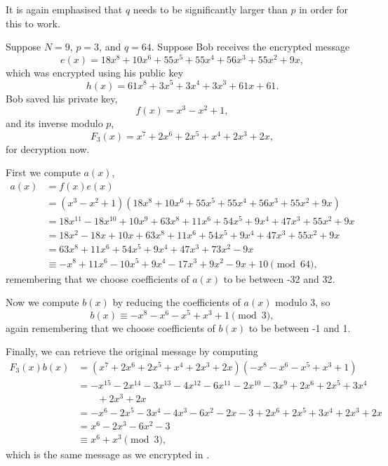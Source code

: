 It is again emphasised that $q$ needs to be significantly larger than $p$ in order for this to work.

\begin{example}
    Suppose $N = 9$, $p = 3$, and $q = 64$. Suppose Bob receives the encrypted message
    \[
        e(x) = 18x^8 + 10x^6 + 55x^5 + 55x^4 + 56x^3 + 55x^2 + 9x,
    \]
    which was encrypted using his public key
    \[
        h(x) = 61x^8 + 3x^5 + 3x^4 + 3x^3 + 61x + 61.
    \]
    Bob saved his private key,
    \[
        f(x) = x^3 - x^2 + 1,
    \]
    and its inverse modulo $p$,
    \[
        F_3(x) = x^7 + 2x^6 + 2x^5 +x^4 + 2x^3 + 2x,
    \]
    for decryption now.

    First we compute $a(x)$,
    \begin{align*}
        a(x) &= f(x)e(x)\\
        &= (x^3 - x^2 + 1)(18x^8 + 10x^6 + 55x^5 + 55x^4 + 56x^3 + 55x^2 + 9x)\\
        &= 18x^{11} - 18x^{10} + 10x^9 + 63x^8 + 11x^6 + 54x^5 + 9x^4 + 47x^3 + 55x^2 + 9x\\
        &= 18x^2 - 18x + 10x + 63x^8 + 11x^6 + 54x^5 + 9x^4 + 47x^3 + 55x^2 + 9x\\
        &= 63x^8 + 11x^6 + 54x^5 + 9x^4 + 47x^3 + 73x^2 - 9x\\
        &\equiv -x^8 + 11x^6 - 10x^5 + 9x^4 - 17x^3 + 9x^2 - 9x + 10 \pmod{64},
    \end{align*}
    remembering that we choose coefficients of $a(x)$ to be between -32 and 32.

    Now we compute $b(x)$ by reducing the coefficients of $a(x)$ modulo 3, so
    \[
        b(x) \equiv -x^8 - x^6 - x^5 + x^3 + 1 \pmod{3},
    \]
    again remembering that we choose coefficients of $b(x)$ to be between -1 and 1.

    Finally, we can retrieve the original message by computing
    \begin{align*}
        F_3(x)b(x) &= (x^7 + 2x^6 + 2x^5 +x^4 + 2x^3 + 2x)(-x^8 - x^6 - x^5 + x^3 + 1)\\
        &= -x^{15} - 2x^{14} - 3x^{13} - 4x^{12} - 6x^{11} - 2x^{10} - 3x^9 + 2x^6 + 2x^5 + 3x^4\\
        &\quad\quad + 2x^3 + 2x\\
        &= -x^6 - 2x^5 - 3x^4 - 4x^3 - 6x^2 - 2x - 3 + 2x^6 + 2x^5 + 3x^4 + 2x^3 + 2x\\
        &= x^6 - 2x^3 - 6x^2 - 3\\
        &\equiv x^6 + x^3 \pmod{3},
    \end{align*}
    which is the same message as we encrypted in .
\end{example}


